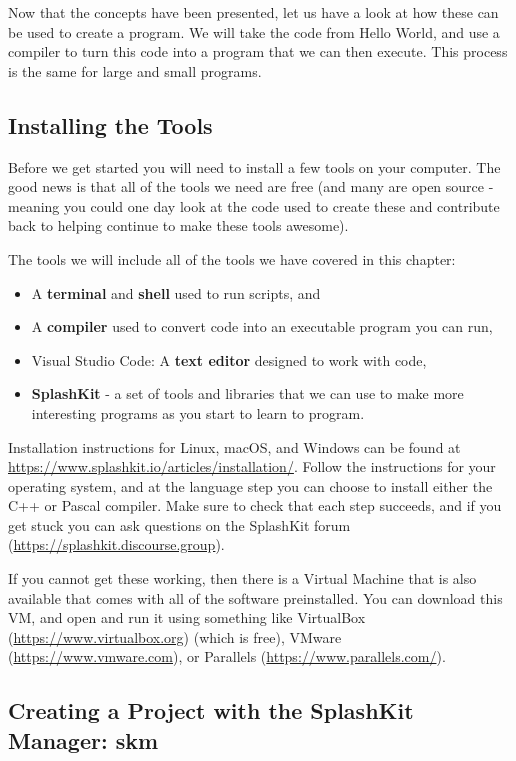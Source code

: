 Now that the concepts have been presented, let us have a look at how these can be used to create a program. We will take the code from Hello World, and use a compiler to turn this code into a program that we can then execute. This process is the same for large and small programs.

\subsection{Installing the Tools}
\label{subs:install}
Before we get started you will need to install a few tools on your computer. The good news is that all of the tools we need are free (and many are open source - meaning you could one day look at the code used to create these and contribute back to helping continue to make these tools awesome).

The tools we will include all of the tools we have covered in this chapter:

\begin{itemize}
   \item A \textbf{terminal} and \textbf{shell} used to run scripts, and 
   \item A \textbf{compiler} used to convert code into an executable program you can run,
   \item Visual Studio Code: A \textbf{text editor} designed to work with code,
   \item \textbf{SplashKit} - a set of tools and libraries that we can use to make more interesting programs as you start to learn to program. 
\end{itemize}

Installation instructions for Linux, macOS, and Windows can be found at \url{https://www.splashkit.io/articles/installation/}. Follow the instructions for your operating system, and at the language step you can choose to install either the C++ or Pascal compiler. Make sure to check that each step succeeds, and if you get stuck you can ask questions on the SplashKit forum (\url{https://splashkit.discourse.group}).

If you cannot get these working, then there is a Virtual Machine that is also available that comes with all of the software preinstalled. You can download this VM, and open and run it using something like VirtualBox (\url{https://www.virtualbox.org}) (which is free), VMware (\url{https://www.vmware.com}), or Parallels (\url{https://www.parallels.com/}).

\clearpage
\subsection{Creating a Project with the SplashKit Manager: skm} %
\label{sub:skm}

